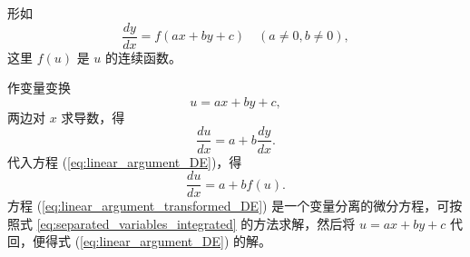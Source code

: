 \begin{definition}[可化为变量分离方程的类型二]\label{def:case2}
    形如
\begin{equation}
\frac{dy}{dx} = f(ax+by+c) \quad (a \ne 0, b \ne 0), \label{eq:linear_argument_DE}
\end{equation}
这里 $f(u)$ 是 $u$ 的连续函数。

\end{definition}
\begin{solution}
    作变量变换
\begin{equation}
u=ax+by+c, \label{eq:linear_argument_substitution_u}
\end{equation}
两边对 $x$ 求导数，得
\begin{equation}
\frac{du}{dx} = a+b\frac{dy}{dx}. \label{eq:linear_argument_du_dx}
\end{equation}
代入方程 (\ref{eq:linear_argument_DE})，得
\begin{equation}
\frac{du}{dx} = a+bf(u). \label{eq:linear_argument_transformed_DE}
\end{equation}
方程 (\ref{eq:linear_argument_transformed_DE}) 是一个变量分离的微分方程，可按照式 \eqref{eq:separated_variables_integrated} 的方法求解，然后将 $u=ax+by+c$
代回，便得式 (\ref{eq:linear_argument_DE}) 的解。
\end{solution}

